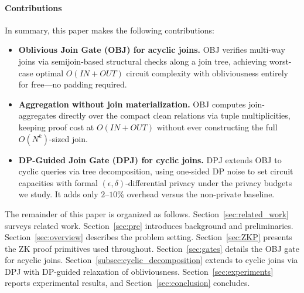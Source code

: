 \documentclass[sigconf]{acmart}
\begin{document}
\paragraph{Contributions}
In summary, this paper makes the following contributions:
\begin{itemize}[leftmargin=1.2em, itemsep=0.3em, topsep=0.2em]
    \item \textbf{Oblivious Join Gate (OBJ) for acyclic joins.}
    OBJ verifies multi-way joins via semijoin-based structural checks along a join tree, achieving worst-case optimal $O(\mathit{IN} + \mathit{OUT})$ circuit complexity with obliviousness entirely for free---no padding required.

    \item \textbf{Aggregation without join materialization.}
    OBJ computes join-aggregates directly over the compact clean relations via tuple multiplicities, keeping proof cost at $O(\mathit{IN} + \mathit{OUT})$ without ever constructing the full $O(N^k)$-sized join.
    
    \item \textbf{DP-Guided Join Gate (DPJ) for cyclic joins.}
    DPJ extends OBJ to cyclic queries via tree decomposition, using one-sided DP noise to set circuit capacities with formal $(\epsilon, \delta)$-differential privacy under the privacy budgets we study. It  adds only $2$--$10\%$ overhead versus the non-private baseline. 

\end{itemize}

The remainder of this paper is organized as follows. Section~\ref{sec:related_work} surveys related work. Section~\ref{sec:pre} introduces background and preliminaries. Section~\ref{sec:overview} describes the problem setting. Section~\ref{sec:ZKP} presents the ZK proof primitives used throughout. Section~\ref{sec:gates} details the OBJ gate for acyclic joins. Section~\ref{subsec:cyclic_decomposition} extends to cyclic joins via DPJ with DP-guided relaxation of obliviousness. Section~\ref{sec:experiments} reports experimental results, and Section~\ref{sec:conclusion} concludes.
\end{document}
